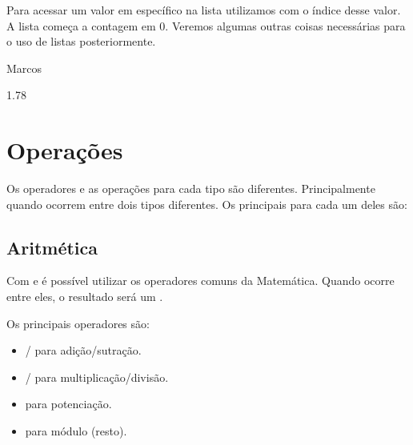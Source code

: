 \documentclass[letterpaper,10pt,english]{jupyterBook}
\begin{document}
\sphinxAtStartPar
Para acessar um valor em específico na lista utilizamos \sphinxcode{\sphinxupquote{{[}{]}}} com o índice desse valor. A lista começa a contagem em 0. Veremos algumas outras coisas necessárias para o uso de listas posteriormente.

\begin{sphinxVerbatim}[commandchars=\\\{\}]
\PYG{p}{[}\PYG{p}{]} 
\end{sphinxVerbatim}

\begin{sphinxVerbatim}[commandchars=\\\{\}]
\PYGZsq{}Marcos\PYGZsq{}
\end{sphinxVerbatim}

\begin{sphinxVerbatim}[commandchars=\\\{\}]
\PYG{p}{[}\PYG{p}{]}
\end{sphinxVerbatim}

\begin{sphinxVerbatim}[commandchars=\\\{\}]
1.78
\end{sphinxVerbatim}


\section{Operações}
\label{\detokenize{chapters/2:operacoes}}
\sphinxAtStartPar
Os operadores e as operações para cada tipo são diferentes. Principalmente quando ocorrem entre dois tipos diferentes. Os principais para cada um deles são:


\subsection{Aritmética}
\label{\detokenize{chapters/2:aritmetica}}
\sphinxAtStartPar
Com  e  é possível utilizar os operadores comuns da Matemática. Quando ocorre entre eles, o resultado será um .

\sphinxAtStartPar
Os principais operadores são:
\begin{itemize}
\item {} 
\sphinxAtStartPar
\sphinxcode{\sphinxupquote{+}}/\sphinxcode{\sphinxupquote{\sphinxhyphen{}}} para adição/sutração.

\item {} 
\sphinxAtStartPar
\sphinxcode{\sphinxupquote{*}}/\sphinxcode{\sphinxupquote{/}} para multiplicação/divisão.

\item {} 
\sphinxAtStartPar
\sphinxcode{\sphinxupquote{**}} para potenciação.

\item {} 
\sphinxAtStartPar
\sphinxcode{\sphinxupquote{\%}} para módulo (resto).

\end{itemize}
\end{document}
